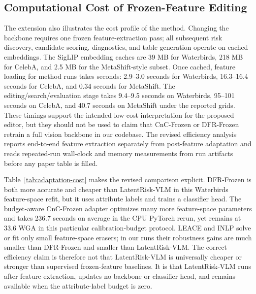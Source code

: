 \subsection{Computational Cost of Frozen-Feature Editing}

\begin{table}[t]
\centering
\caption{Post-feature adaptation cost on Waterbirds with cached frozen CLIP features. Feature extraction is excluded from adaptation time. Values are mean $\pm$ standard deviation over three seeds when available. CnC-Frozen is measured using the budget-aware cached-feature adapter from the attribute-label sweep, not copied from the single Table~\ref{tab:classification} configuration.}
\label{tab:adaptation-cost}
\small
\setlength{\tabcolsep}{4.0pt}

\end{table}

The extension also illustrates the cost profile of the method. Changing the backbone requires one frozen feature-extraction pass; all subsequent risk discovery, candidate scoring, diagnostics, and table generation operate on cached embeddings. The SigLIP embedding caches are 39 MB for Waterbirds, 218 MB for CelebA, and 2.5 MB for the MetaShift-style subset. Once cached, feature loading for method runs takes seconds: 2.9--3.0 seconds for Waterbirds, 16.3--16.4 seconds for CelebA, and 0.34 seconds for MetaShift. The editing/search/evaluation stage takes 9.4--9.5 seconds on Waterbirds, 95--101 seconds on CelebA, and 40.7 seconds on MetaShift under the reported grids. These timings support the intended low-cost interpretation for the proposed editor, but they should not be used to claim that CnC-Frozen or DFR-Frozen retrain a full vision backbone in our codebase. The revised efficiency analysis reports end-to-end feature extraction separately from post-feature adaptation and reads repeated-run wall-clock and memory measurements from run artifacts before any paper table is filled.

Table~\ref{tab:adaptation-cost} makes the revised comparison explicit. DFR-Frozen is both more accurate and cheaper than LatentRisk-VLM in this Waterbirds feature-space refit, but it uses attribute labels and trains a classifier head. The budget-aware CnC-Frozen adapter optimizes many more feature-space parameters and takes 236.7 seconds on average in the CPU PyTorch rerun, yet remains at 33.6 WGA in this particular calibration-budget protocol. LEACE and INLP solve or fit only small feature-space erasers; in our runs their robustness gains are much smaller than DFR-Frozen and smaller than LatentRisk-VLM. The correct efficiency claim is therefore not that LatentRisk-VLM is universally cheaper or stronger than supervised frozen-feature baselines. It is that LatentRisk-VLM runs after feature extraction, updates no backbone or classifier head, and remains available when the attribute-label budget is zero.
